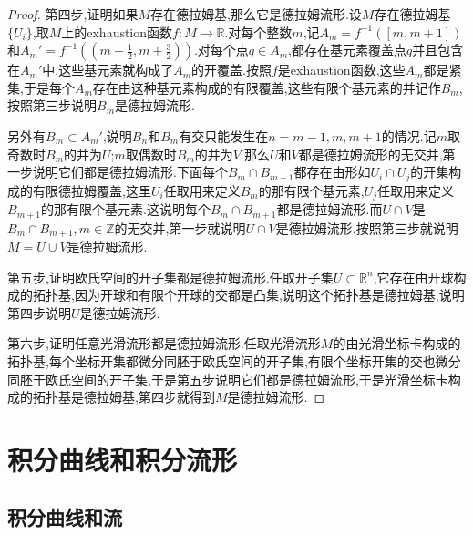 \begin{enumerate}
\begin{proof}
    	第四步,证明如果$M$存在德拉姆基,那么它是德拉姆流形.设$M$存在德拉姆基$\{U_i\}$,取$M$上的exhaustion函数$f:M\to\mathbb{R}$.对每个整数$m$,记$A_m=f^{-1}([m,m+1])$和$A_m'=f^{-1}((m-\frac{1}{2},m+\frac{3}{2}))$.对每个点$q\in A_m$,都存在基元素覆盖点$q$并且包含在$A_m'$中.这些基元素就构成了$A_m$的开覆盖.按照$f$是exhaustion函数,这些$A_m$都是紧集,于是每个$A_m$存在由这种基元素构成的有限覆盖,这些有限个基元素的并记作$B_m$,按照第三步说明$B_m$是德拉姆流形.
    	
    	另外有$B_m\subset A_m'$,说明$B_n$和$B_m$有交只能发生在$n=m-1,m,m+1$的情况.记$m$取奇数时$B_m$的并为$U$;$m$取偶数时$B_m$的并为$V$.那么$U$和$V$都是德拉姆流形的无交并,第一步说明它们都是德拉姆流形.下面每个$B_m\cap B_{m+1}$都存在由形如$U_i\cap U_j$的开集构成的有限德拉姆覆盖,这里$U_i$任取用来定义$B_m$的那有限个基元素,$U_j$任取用来定义$B_{m+1}$的那有限个基元素.这说明每个$B_m\cap B_{m+1}$都是德拉姆流形.而$U\cap V$是$B_m\cap B_{m+1},m\in\mathbb{Z}$的无交并,第一步就说明$U\cap V$是德拉姆流形.按照第三步就说明$M=U\cup V$是德拉姆流形.
    	
    	第五步,证明欧氏空间的开子集都是德拉姆流形.任取开子集$U\subset\mathbb{R}^n$,它存在由开球构成的拓扑基,因为开球和有限个开球的交都是凸集,说明这个拓扑基是德拉姆基,说明第四步说明$U$是德拉姆流形.
    	
    	第六步,证明任意光滑流形都是德拉姆流形.任取光滑流形$M$的由光滑坐标卡构成的拓扑基,每个坐标开集都微分同胚于欧氏空间的开子集,有限个坐标开集的交也微分同胚于欧氏空间的开子集,于是第五步说明它们都是德拉姆流形,于是光滑坐标卡构成的拓扑基是德拉姆基,第四步就得到$M$是德拉姆流形.
    \end{proof}
\end{enumerate}
\newpage
\section{积分曲线和积分流形}
\subsection{积分曲线和流}

